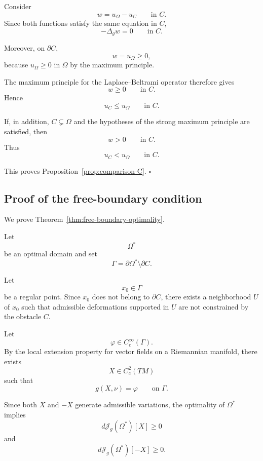 \documentclass{article}
\begin{document}
Consider
\[
w=u_\Omega-u_C
\qquad\text{in }C.
\]
Since both functions satisfy the same equation in $C$,
\[
-\Delta_g w=0
\qquad\text{in }C.
\]

Moreover, on $\partial C$,
\[
w=u_\Omega\geq0,
\]
because $u_\Omega\geq0$ in $\Omega$ by the maximum principle.

The maximum principle for the Laplace--Beltrami operator therefore
gives
\[
w\geq0
\qquad\text{in }C.
\]
Hence
\begin{equation}
u_C\leq u_\Omega
\qquad\text{in }C.
\label{eq:comparison-proof}
\end{equation}

If, in addition, $C\subsetneq\Omega$ and the hypotheses of the strong
maximum principle are satisfied, then
\[
w>0
\qquad\text{in }C.
\]
Thus
\[
u_C<u_\Omega
\qquad\text{in }C.
\]

This proves Proposition~\ref{prop:comparison-C}.
\hfill$\square$


\subsection{Proof of the free-boundary condition}
\label{subsec:proof-free-boundary}

We prove Theorem~\ref{thm:free-boundary-optimality}.

Let
\[
\Omega^\ast
\]
be an optimal domain and set
\[
\Gamma
=
\partial\Omega^\ast\setminus\partial C.
\]

Let
\[
x_0\in\Gamma
\]
be a regular point. Since $x_0$ does not belong to $\partial C$, there
exists a neighborhood $U$ of $x_0$ such that admissible deformations
supported in $U$ are not constrained by the obstacle $C$.

Let
\[
\varphi\in C_c^\infty(\Gamma).
\]
By the local extension property for vector fields on a Riemannian
manifold, there exists
\[
X\in C_c^2(TM)
\]
such that
\begin{equation}
g(X,\nu)=\varphi
\qquad\text{on }\Gamma.
\label{eq:normal-extension}
\end{equation}

Since both $X$ and $-X$ generate admissible variations, the optimality
of $\Omega^\ast$ implies
\begin{equation}
d\mathcal J_g(\Omega^\ast)[X]\geq0
\end{equation}
and
\begin{equation}
d\mathcal J_g(\Omega^\ast)[-X]\geq0.
\end{equation}
\end{document}
